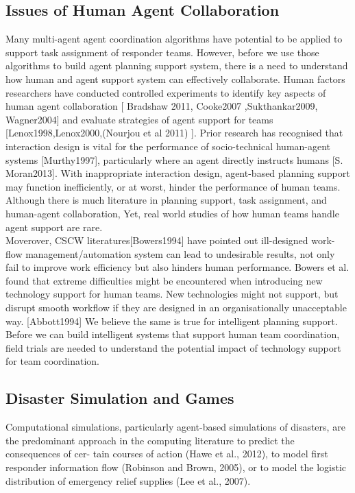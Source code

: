 \subsection{ Issues of Human Agent Collaboration }
Many multi-agent agent coordination algorithms have potential to be applied to support task assignment of responder teams. However, before we use those algorithms to build agent planning support system, there is a need to understand how human and agent support system can effectively collaborate.  Human factors researchers have conducted controlled experiments to identify key aspects of human agent collaboration [ Bradshaw 2011, Cooke2007 ,Sukthankar2009, Wagner2004] and evaluate strategies of agent support for teams [Lenox1998,Lenox2000,(Nourjou et al 2011) ]. Prior research has recognised that interaction design is vital for the performance of socio-technical human-agent systems [Murthy1997], particularly where an agent directly instructs humans [S. Moran2013]. With inappropriate interaction design, agent-based planning support may function inefficiently, or at worst, hinder the performance of human teams. Although there is much literature in planning support, task assignment, and human-agent collaboration, Yet, real world studies of how human teams handle agent support are rare. \\

Moverover, CSCW literatures[Bowers1994] have pointed out ill-designed work-flow management/automation system can lead to undesirable results, not only fail to improve work efficiency but also hinders human performance. Bowers et al. found that extreme difficulties might be encountered when introducing new technology support for human teams. New technologies might not support, but  disrupt smooth workflow if they are designed in an organisationally unacceptable way. [Abbott1994] We believe the same is true for intelligent planning support. Before we can build intelligent systems that support human team coordination, field trials are needed to understand the potential impact of technology support for team coordination. \\

\subsection{ Disaster Simulation and Games }

Computational simulations, particularly agent-based simulations of disasters, are the predominant approach in the computing literature to predict the consequences of cer- tain courses of action (Hawe et al., 2012), to model first responder information flow (Robinson and Brown, 2005), or to model the logistic distribution of emergency relief supplies (Lee et al., 2007).\\

